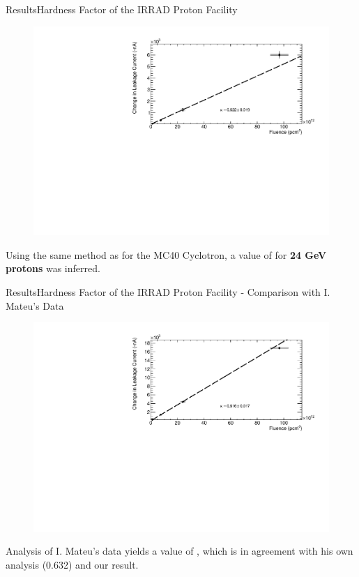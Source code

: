 \documentclass{beamer}
\begin{document}
    \begin{frame}{Results}{Hardness Factor of the IRRAD Proton Facility}
        \begin{figure}
            \centering
            \includegraphics[width = 0.9\linewidth]{IRRAD_seminar.pdf}
        \end{figure}
    Using the same method as for the MC40 Cyclotron, a value of  for \textbf{24 GeV protons} was inferred.
    \end{frame}
    
    \begin{frame}{Results}{Hardness Factor of the IRRAD Proton Facility - Comparison with I. Mateu's Data}
        \begin{figure}
            \centering
            \includegraphics[width = 0.9\linewidth]{Isidre_seminar.pdf}
        \end{figure}
    \vspace{-0.5cm}
    Analysis of I. Mateu's data yields a value of , which is in agreement with his own analysis (0.632) and our result.
    \end{frame}
    
\end{document}
